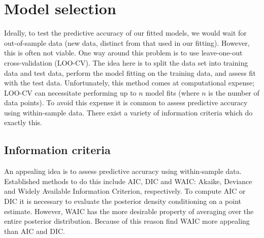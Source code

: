 \section{Model selection}
\label{sec:model_comparison}

Ideally, to test the predictive accuracy of our fitted models, we would wait for
out-of-sample data (new data, distinct from that used in our fitting).  However, this is
often not viable. One way around this problem is to use leave-one-out cross-validation
(LOO-CV). The idea here is to split the data set into training data and test data, perform
the model fitting on the training data, and assess fit with the test data.  Unfortunately,
this method comes at computational expense; LOO-CV can necessitate performing up to $n$
model fits (where $n$ is the number of data points). To avoid this expense it is common to
assess predictive accuracy using within-sample data. There exist a variety of information
criteria which do exactly this.

\subsection{Information criteria}

An appealing idea is to assess predictive accuracy using within-sample data. Established
methods to do this include AIC, DIC and WAIC: Akaike, Deviance and Widely Available
Information Criterion, respectively. To compute AIC or DIC it is necessary to evaluate the
posterior density conditioning on a point estimate. However, WAIC has the more desirable
property of averaging over the entire posterior distribution. Because of this reason
\textcite{gelman13} find WAIC more appealing than AIC and DIC.



